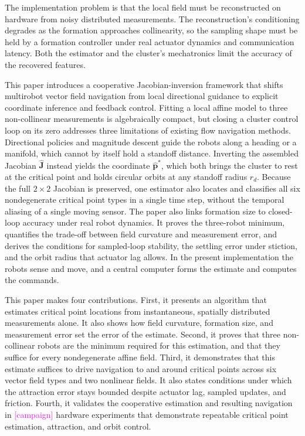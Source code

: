 \documentclass[lettersize,journal]{IEEEtran}
\newcommand{\open}[1]{\textcolor{magenta}{[#1]}}     %
\begin{document}
The implementation problem is that the local field must be reconstructed on hardware from noisy distributed measurements. The reconstruction's conditioning degrades as the formation approaches collinearity, so the sampling shape must be held by a formation controller under real actuator dynamics and communication latency. Both the estimator and the cluster's mechatronics limit the accuracy of the recovered features.

This paper introduces a cooperative Jacobian-inversion framework that shifts multirobot vector field navigation from local directional guidance to explicit coordinate inference and feedback control. Fitting a local affine model to three non-collinear measurements is algebraically compact, but closing a cluster control loop on its zero addresses three limitations of existing flow navigation methods. Directional policies \cite{23,33} and magnitude descent \cite{48} guide the robots along a heading or a manifold, which cannot by itself hold a standoff distance. Inverting the assembled Jacobian $\hat{\mathbf{J}}$ instead yields the coordinate $\hat{\mathbf{p}}^*$, which both brings the cluster to rest at the critical point and holds circular orbits at any standoff radius $r_d$. Because the full $2 \times 2$ Jacobian is preserved, one estimator also locates and classifies all six nondegenerate critical point types in a single time step, without the temporal aliasing of a single moving sensor. The paper also links formation size to closed-loop accuracy under real robot dynamics. It proves the three-robot minimum, quantifies the trade-off between field curvature and measurement error, and derives the conditions for sampled-loop stability, the settling error under stiction, and the orbit radius that actuator lag allows. In the present implementation the robots sense and move, and a central computer forms the estimate and computes the commands.

This paper makes four contributions. First, it presents an algorithm that estimates critical point locations from instantaneous, spatially distributed measurements alone. It also shows how field curvature, formation size, and measurement error set the error of the estimate. Second, it proves that three non-collinear robots are the minimum required for this estimation, and that they suffice for every nondegenerate affine field. Third, it demonstrates that this estimate suffices to drive navigation to and around critical points across six vector field types and two nonlinear fields. It also states conditions under which the attraction error stays bounded despite actuator lag, sampled updates, and friction. Fourth, it validates the cooperative estimation and resulting navigation in \open{campaign} hardware experiments that demonstrate repeatable critical point estimation, attraction, and orbit control. %
\end{document}
